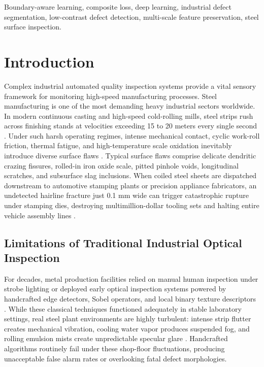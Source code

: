 \documentclass{ieeeaccess}
\begin{document}
\begin{keywords}
Boundary-aware learning, composite loss, deep learning, industrial defect segmentation, low-contrast defect detection, multi-scale feature preservation, steel surface inspection.
\end{keywords}

\titlepgskip=-15pt

\maketitle

\section{Introduction}
\label{sec:introduction}
Complex industrial automated quality inspection systems provide a vital sensory framework for monitoring high-speed manufacturing processes. Steel manufacturing is one of the most demanding heavy industrial sectors worldwide. In modern continuous casting and high-speed cold-rolling mills, steel strips rush across finishing stands at velocities exceeding 15 to 20 meters every single second \cite{survey2024}. Under such harsh operating regimes, intense mechanical contact, cyclic work-roll friction, thermal fatigue, and high-temperature scale oxidation inevitably introduce diverse surface flaws \cite{neu_benchmark2025}. Typical surface flaws comprise delicate dendritic crazing fissures, rolled-in iron oxide scale, pitted pinhole voids, longitudinal scratches, and subsurface slag inclusions. When coiled steel sheets are dispatched downstream to automotive stamping plants or precision appliance fabricators, an undetected hairline fracture just 0.1 mm wide can trigger catastrophic rupture under stamping dies, destroying multimillion-dollar tooling sets and halting entire vehicle assembly lines \cite{survey2024, csdd_dataset2025}.

\subsection{Limitations of Traditional Industrial Optical Inspection}
\label{sec:intro_limitations}
For decades, metal production facilities relied on manual human inspection under strobe lighting or deployed early optical inspection systems powered by handcrafted edge detectors, Sobel operators, and local binary texture descriptors \cite{survey2024}. While these classical techniques functioned adequately in stable laboratory settings, real steel plant environments are highly turbulent: intense strip flutter creates mechanical vibration, cooling water vapor produces suspended fog, and rolling emulsion mists create unpredictable specular glare \cite{ispad2025}. Handcrafted algorithms routinely fail under these shop-floor fluctuations, producing unacceptable false alarm rates or overlooking fatal defect morphologies.
\end{document}
